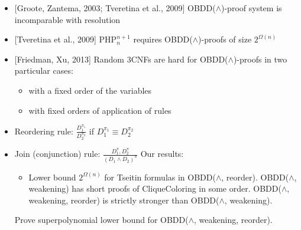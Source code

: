 {
\begin{itemize}
\item{} [Groote, Zantema, 2003; Tveretina et al., 2009]  OBDD($\land$)-proof system is incomparable with resolution
\item{} [Tveretina et al., 2009] PHP$^{n+1}_n$ requires OBDD($\land$)-proofs of size $2^{\Omega(n)}$
\item{} [Friedman, Xu, 2013] Random 3CNFs are hard for OBDD($\land$)-proofs in two particular cases:
\begin{itemize}
\item with a fixed order of the variables
\item with fixed orders of application of rules
\end{itemize}         
\end{itemize}
}

{
\begin{itemize}
\item Reordering rule: $\frac{D_1^{\pi_1}}{D_2^{\pi_2}}$ if $D_1^{\pi_1}\equiv D_2^{\pi_2}$
\item Join (conjunction) rule: $\frac{D_1^{\pi}, D_2^{\pi}} {(D_1\land D_2)^{\pi}}$
\pitem Our results:
\begin{itemize}
\pitem OBDD($\land$, reorder) is strictly stronger than OBDD($\land$)
\pitem Lower bound $2^{\Omega(n)}$ for PHP$^{n+1}_n$ in OBDD($\land$, reorder).
\item Lower bound $2^{\Omega(n)}$ for Tseitin formulas in OBDD($\land$, reorder).
\pitem OBDD($\land$, weakening) has short proofs of CliqueColoring in some order.
\pitem OBDD($\land$, weakening, reorder) is strictly stronger than OBDD($\land$, weakening).
\end{itemize}
\pitem {} Prove superpolynomial lower bound for OBDD($\land$, weakening, reorder).
\end{itemize}
}

